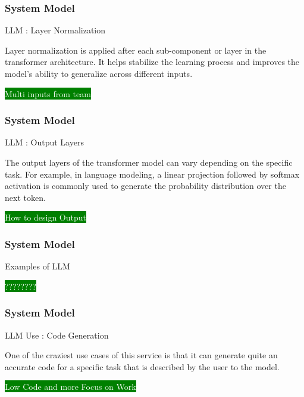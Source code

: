 \newpage
\begin{frame}
\frametitle{ System Model }
\begin{block}{LLM :  Layer Normalization }

 Layer normalization is applied after each sub-component or layer in the transformer architecture. It helps stabilize the learning process and improves the model’s ability to generalize across different inputs.

  \colorbox{green}{ \textcolor{white}{ Multi inputs from team } }
  
\end{block}
\end{frame}




\newpage
\begin{frame}
\frametitle{ System Model }
\begin{block}{LLM : Output Layers }

The output layers of the transformer model can vary depending on the specific task. For example, in language modeling, a linear projection followed by softmax activation is commonly used to generate the probability distribution over the next token.

 \colorbox{green}{ \textcolor{white}{ How to design Output } }
 
\end{block}
\end{frame}




\newpage
\begin{frame}
\frametitle{ System Model }
\begin{block}{Examples of LLM }

 \colorbox{green}{ \textcolor{white}{ ???????? } }
 
\end{block}
\end{frame}




\newpage
\begin{frame}
\frametitle{ System Model }
\begin{block}{LLM Use : Code Generation }

 One of the craziest use cases of this service is that it can generate quite an accurate code for a specific task that is described by the user to the model.

 \colorbox{green}{ \textcolor{white}{  Low Code and more Focus on Work} }
 
\end{block}
\end{frame}



